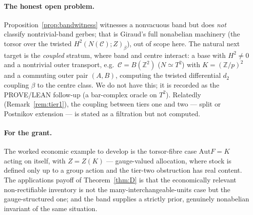 \documentclass[11pt]{article}
\theoremstyle{definition}
\newcommand{\C}{\mathcal{C}}
\newcommand{\Z}{\mathbb{Z}}
\newcommand{\Aut}{\mathrm{Aut}}
\newcommand{\Zc}{Z}
\begin{document}
\paragraph{The honest open problem.}
Proposition~\ref{prop:bandwitness} witnesses a nonvacuous band but does \emph{not} classify
nontrivial-band gerbes; that is Giraud's full nonabelian machinery (the torsor over the twisted
$H^2(N(\C);\Zc)_\beta$), out of scope here. The natural next target is the \emph{coupled} stratum,
where band and centre interact: a base with $H^2\ne0$ and a nontrivial outer transport, e.g.\
$\C=B(\Z^2)$ ($N\simeq T^2$) with $K=(\Z/p)^2$ and a commuting outer pair $(A,B)$, computing the
twisted differential $d_2$ coupling $\beta$ to the centre class. We do not have this; it is
recorded as the PROVE/LEAN follow-up (a bar-complex oracle on $T^2$). Relatedly
(Remark~\ref{rem:tier1}), the coupling between tiers one and two --- split or Postnikov extension ---
is stated as a filtration but not computed.

\paragraph{For the grant.}
The worked economic example to develop is the torsor-fibre case $\Aut F=K$ acting on itself, with
$\Zc=Z(K)$ --- gauge-valued allocation, where stock is defined only up to a group action and the
tier-two obstruction has real content. The applications payoff of Theorem~\ref{thm:D} is that the
economically relevant non-rectifiable inventory is not the many-interchangeable-units case but the
gauge-structured one; and the band supplies a strictly prior, genuinely nonabelian invariant of the
same situation.
\end{document}

